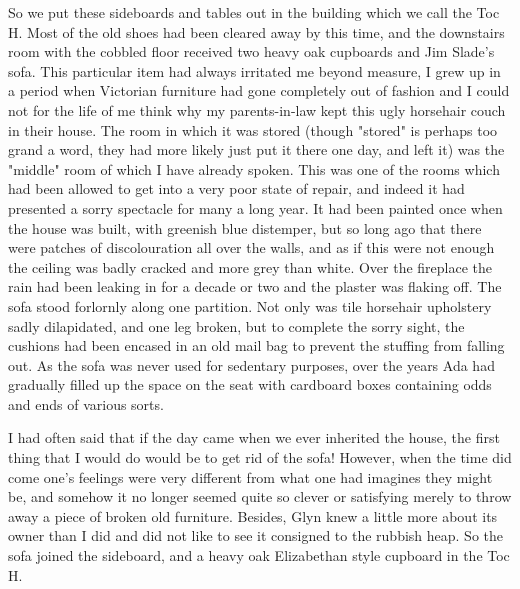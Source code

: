 So we put these sideboards and tables out in the building which we call the Toc H. Most of the old shoes had been cleared away by this time, and the downstairs room with the cobbled floor received two heavy oak cupboards and Jim Slade's sofa. This particular item had always irritated me beyond measure, I grew up in a period when Victorian furniture had gone completely out of fashion and I could not for the life of me think why my parents-in-law kept this ugly horsehair couch in their house. The room in which it was stored (though "stored" is perhaps too grand a word, they had more likely just put it there one day, and left it) was the "middle" room of which I have already spoken. This was one of the rooms which had been allowed to get into a very poor state of repair, and indeed it had presented a sorry spectacle for many a long year. It had been painted once when the house was built, with greenish blue distemper, but so long ago that there were patches of discolouration all over the walls, and as if this were not enough the ceiling was badly cracked and more grey than white. Over the fireplace the rain had been leaking in for a decade or two and the plaster was flaking off. The sofa stood forlornly along one partition. Not only was tile horsehair upholstery sadly dilapidated, and one leg broken, but to complete the sorry sight, the cushions had been encased in an old mail bag to prevent the stuffing from falling out. As the sofa was never used for sedentary purposes, over the years Ada had gradually filled up the space on the seat with cardboard boxes containing odds and ends of various sorts.

I had often said that if the day came when we ever inherited the house, the first thing that I would do would be to get rid of the sofa! However, when the time did come one's feelings were very different from what one had imagines they might be, and somehow it no longer seemed quite so clever or satisfying merely to throw away a piece of broken old furniture. Besides, Glyn knew a little more about its owner than I did and did not like to see it consigned to the rubbish heap. So the sofa joined the sideboard, and a heavy oak Elizabethan style cupboard in the Toc H.


